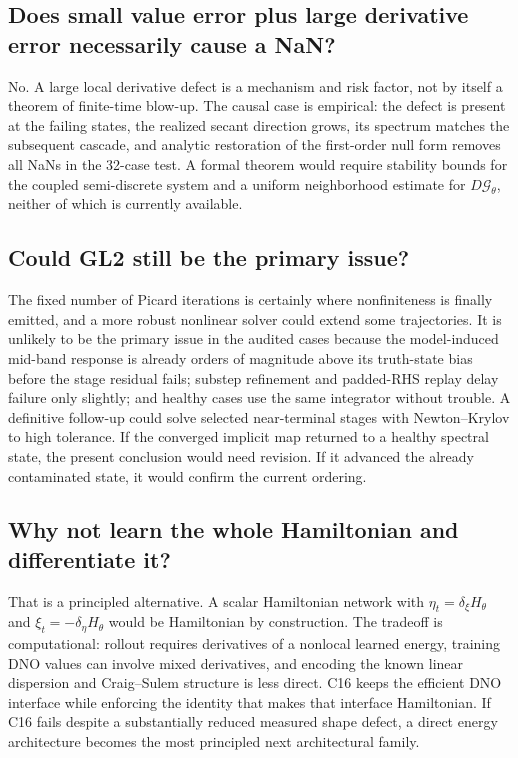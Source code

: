 \documentclass[11pt]{article}
\newcommand{\Gt}{\mathcal{G}_{\theta}}
\begin{document}
\subsection{Does small value error plus large derivative error necessarily
cause a NaN?}

No.  A large local derivative defect is a mechanism and risk factor, not by
itself a theorem of finite-time blow-up.  The causal case is empirical: the
defect is present at the failing states, the realized secant direction grows,
its spectrum matches the subsequent cascade, and analytic restoration of the
first-order null form removes all NaNs in the 32-case test.  A formal theorem
would require stability bounds for the coupled semi-discrete system and a
uniform neighborhood estimate for \(D\Gt\), neither of which is currently
available.

\subsection{Could GL2 still be the primary issue?}

The fixed number of Picard iterations is certainly where nonfiniteness is
finally emitted, and a more robust nonlinear solver could extend some
trajectories.  It is unlikely to be the primary issue in the audited cases
because the model-induced mid-band response is already orders of magnitude
above its truth-state bias before the stage residual fails; substep refinement
and padded-RHS replay delay failure only slightly; and healthy cases use the
same integrator without trouble.  A definitive follow-up could solve selected
near-terminal stages with Newton--Krylov to high tolerance.  If the converged
implicit map returned to a healthy spectral state, the present conclusion
would need revision.  If it advanced the already contaminated state, it would
confirm the current ordering.

\subsection{Why not learn the whole Hamiltonian and differentiate it?}

That is a principled alternative.  A scalar Hamiltonian network with
\(\eta_t=\delta_\xi H_\theta\) and
\(\xi_t=-\delta_\eta H_\theta\) would be Hamiltonian by construction.  The
tradeoff is computational: rollout requires derivatives of a nonlocal learned
energy, training DNO values can involve mixed derivatives, and encoding the
known linear dispersion and Craig--Sulem structure is less direct.  C16 keeps
the efficient DNO interface while enforcing the identity that makes that
interface Hamiltonian.  If C16 fails despite a substantially reduced measured
shape defect, a direct energy architecture becomes the most principled next
architectural family.
\end{document}
